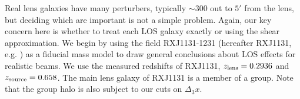 Real lens galaxies have many perturbers, typically $\sim 300$ out to $5'$ from the lens, but deciding which are important is not a simple problem. Again, our key concern here is whether to treat each LOS galaxy exactly or using the shear approximation. We begin by using the field RXJ1131-1231 (hereafter RXJ1131, e.g. \citealt{Suyu13}) as a fiducial mass model to draw general conclusions about LOS effects for realistic beams. We use the measured redshifts of RXJ1131, $z_{\rm{lens}} = 0.2936$ and $z_{\rm{source}} = 0.658$.  The main lens galaxy of RXJ1131 is a member of a group. Note that the group halo is also subject to our cuts on $\Delta_3 x$.
  
  
  
  